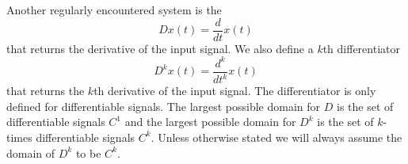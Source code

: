 

Another regularly encountered system is the 
\[
Dx(t) = \frac{d}{dt} x(t)
\]
that returns the derivative of the input signal.  We also define a $k$th differentiator
\[
D^k x(t) = \frac{d^k}{dt^k} x(t)
\]
that returns the $k$th derivative of the input signal.  %
The differentiator is only defined for differentiable signals.  The largest possible domain for $D$ is the set of differentiable signals $C^1$ and the largest possible domain for $D^k$ is the set of $k$-times differentiable signals $C^k$.  Unless otherwise stated we will always assume the domain of $D^k$ to be $C^k$.

